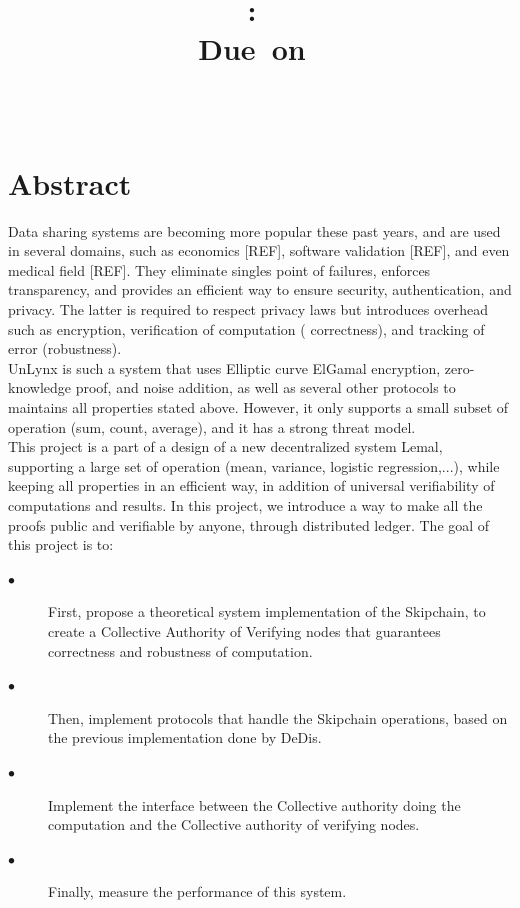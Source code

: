\documentclass{article}
\title{
\logoepfl
\vspace{2in}
\textmd{\textbf{\hmwkClass:\ \hmwkTitle}}\\
\normalsize\vspace{0.1in}\small{Due\ on\ \hmwkDueDate}\\
\vspace{0.1in}\large{\textit{\hmwkClassInstructor\ \hmwkClassTime}}
\author{\textbf{\hmwkAuthorName}}
\vspace{3in}
}
\begin{document}
\maketitle

\newpage
\section*{Abstract}
Data sharing systems are becoming more popular these past years, and are used in several domains, such as economics [REF], software validation [REF], and even medical field [REF]. They eliminate singles point of failures, enforces transparency, and provides an efficient way to ensure security, authentication, and privacy.
The latter is required to respect privacy laws but introduces overhead such as encryption, verification of computation ( correctness), and tracking of error (robustness).\\
UnLynx is such a system that uses Elliptic curve ElGamal encryption, zero-knowledge proof, and noise addition, as well as several other protocols to maintains all properties stated above. However, it only supports a small subset of operation (sum, count, average), and it has a strong threat model.\\
This project is a part of a design of a new decentralized system Lemal, supporting a large set of operation (mean, variance, logistic regression,...), while keeping all properties in an efficient way, in addition of universal verifiability of computations and results.
In this project, we introduce a way to make all the proofs public and verifiable by anyone, through distributed ledger.
The goal of this project is to:
\begin{description}
\item[$\bullet$] First, propose a theoretical system implementation of the Skipchain, to create a Collective Authority of Verifying nodes that guarantees correctness and robustness of computation.
\item[$\bullet$] Then, implement protocols that handle the Skipchain operations, based on the previous implementation done by DeDis.
\item[$\bullet$] Implement the interface between the Collective authority doing the computation and the Collective authority of verifying nodes.
\item[$\bullet$] Finally, measure the performance of this system.
\end{description}
\end{document}
